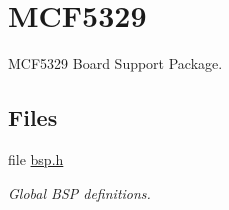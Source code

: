 \hypertarget{group__RTEMSBSPsM68kMCF5329}{}\section{M\+C\+F5329}
\label{group__RTEMSBSPsM68kMCF5329}


M\+C\+F5329 Board Support Package.  


\subsection*{Files}
\begin{DoxyCompactItemize}
\item 
file \mbox{\hyperlink{bsps_2m68k_2mcf5329_2include_2bsp_8h}{bsp.\+h}}
\begin{DoxyCompactList}\small\item\em Global B\+SP definitions. \end{DoxyCompactList}\end{DoxyCompactItemize}
